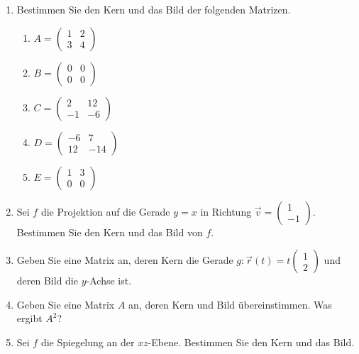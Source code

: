 \begin{ueb}
    {}{}

\begin{enumerate}
  \item Bestimmen Sie den Kern und das Bild der folgenden Matrizen.  
  \begin{enumerate}
    \item \( A = \begin{pmatrix} 1 & 2 \\ 3 & 4 \end{pmatrix} \)
    \item \( B = \begin{pmatrix} 0 & 0 \\ 0 & 0 \end{pmatrix} \)
    \item \( C = \begin{pmatrix} 2 & 12 \\ -1 & -6 \end{pmatrix} \)
    \item \( D = \begin{pmatrix} -6 & 7 \\ 12 & -14 \end{pmatrix} \)
    \item \( E = \begin{pmatrix} 1 & 3 \\ 0 & 0 \end{pmatrix} \)
  \end{enumerate}

  \item Sei \( f \) die Projektion auf die Gerade \( y = x \) in Richtung  
  \( \vec{v} = \begin{pmatrix} 1 \\ -1 \end{pmatrix} \).  
  Bestimmen Sie den Kern und das Bild von \( f \).

  \item Geben Sie eine Matrix an, deren Kern die Gerade  
  \( g \colon \vec{r}(t) = t \begin{pmatrix} 1 \\ 2 \end{pmatrix} \)  
  und deren Bild die \( y \)-Achse ist.

  \item Geben Sie eine Matrix \( A \) an, deren Kern und Bild übereinstimmen.  
  Was ergibt \( A^2 \)?

  \item Sei \( f \) die Spiegelung an der \( xz \)-Ebene.  
  Bestimmen Sie den Kern und das Bild.


\end{enumerate}
\end{ueb}
